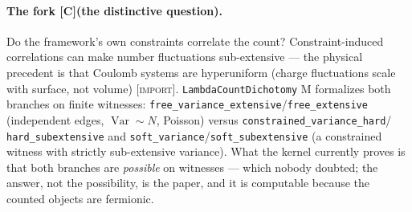 \documentclass[11pt]{article}
\newcommand{\Kernel}{\textcolor{kcol}{\textsc{M}}}       %
\newcommand{\Import}{\textcolor{icol}{\textsc{[import]}}} %
\newcommand{\Conj}{\textcolor{ccol}{\textsc{[C]}}}        %
\newcommand{\lm}[1]{\texttt{#1}}
\begin{document}
\paragraph{The fork \Conj (the distinctive question).}  Do the framework's own
constraints correlate the count?  Constraint-induced correlations can make
number fluctuations sub-extensive --- the physical precedent is that Coulomb
systems are hyperuniform (charge fluctuations scale with surface, not volume)
\Import.  \lm{LambdaCountDichotomy} \Kernel{} formalizes both branches on finite
witnesses: \lm{free\_variance\_extensive}/\lm{free\_extensive} (independent
edges, $\operatorname{Var}\sim N$, Poisson) versus \lm{constrained\_variance\_hard}/
\lm{hard\_subextensive} and \lm{soft\_variance}/\lm{soft\_subextensive} (a
constrained witness with strictly sub-extensive variance).  What the kernel
currently proves is that both branches are \emph{possible} on witnesses --- which
nobody doubted; the answer, not the possibility, is the paper, and it is
computable because the counted objects are fermionic.
\end{document}
